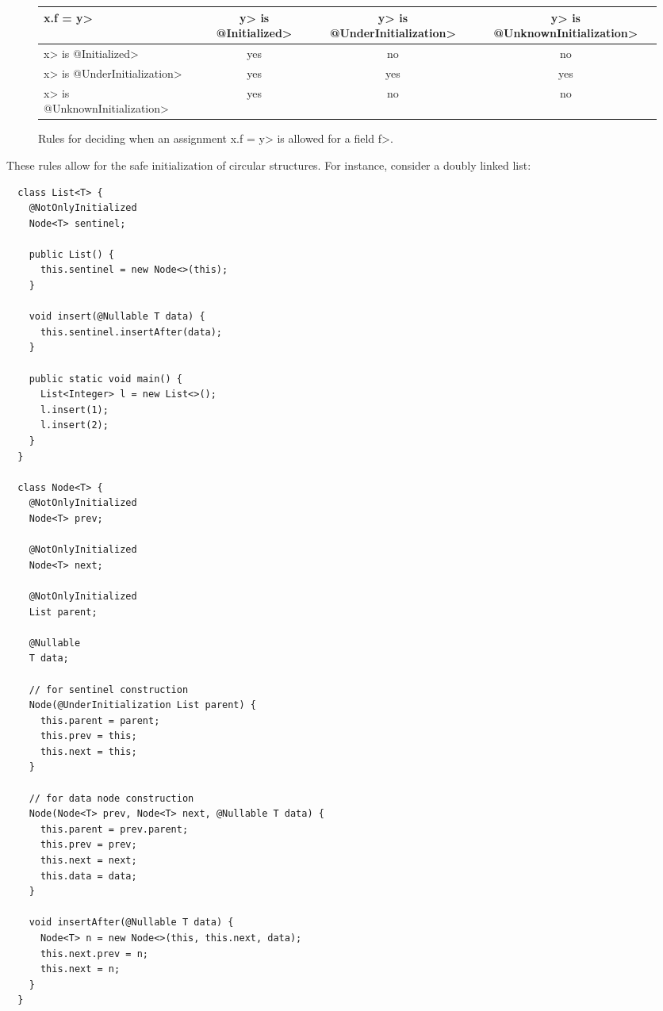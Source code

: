 \begin{figure}
\centering
\begin{tabular}{l|ccc}
  \<x.f = y>&\<y> is \<@Initialized>& \<y> is \<@UnderInitialization>& \<y> is \<@UnknownInitialization>\\ \hline
  \<x> is \<@Initialized> & yes & no & no \\
  \<x> is \<@UnderInitialization> & yes & yes & yes \\
  \<x> is \<@UnknownInitialization> & yes & no & no \\
\end{tabular}
\caption{Rules for deciding when an assignment \<x.f = y> is allowed for a
 field \<f>.}
\label{fig-init-write-field}
\end{figure}

These rules allow for the safe initialization of circular structures.  For instance,
consider a doubly linked list:

\begin{Verbatim}
  class List<T> {
    @NotOnlyInitialized
    Node<T> sentinel;

    public List() {
      this.sentinel = new Node<>(this);
    }

    void insert(@Nullable T data) {
      this.sentinel.insertAfter(data);
    }

    public static void main() {
      List<Integer> l = new List<>();
      l.insert(1);
      l.insert(2);
    }
  }

  class Node<T> {
    @NotOnlyInitialized
    Node<T> prev;

    @NotOnlyInitialized
    Node<T> next;

    @NotOnlyInitialized
    List parent;

    @Nullable
    T data;

    // for sentinel construction
    Node(@UnderInitialization List parent) {
      this.parent = parent;
      this.prev = this;
      this.next = this;
    }

    // for data node construction
    Node(Node<T> prev, Node<T> next, @Nullable T data) {
      this.parent = prev.parent;
      this.prev = prev;
      this.next = next;
      this.data = data;
    }

    void insertAfter(@Nullable T data) {
      Node<T> n = new Node<>(this, this.next, data);
      this.next.prev = n;
      this.next = n;
    }
  }
\end{Verbatim}


